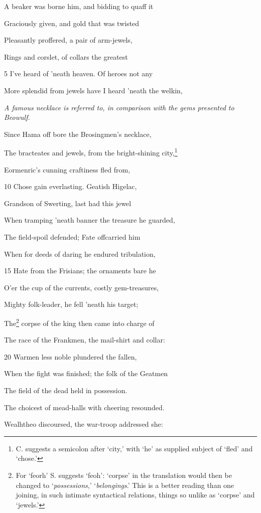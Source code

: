 A beaker was borne him, and bidding to quaff it

Graciously given, and gold that was twisted

Pleasantly proffered, a pair of arm-jewels,

Rings and corslet, of collars the greatest

5
I’ve heard of ’neath heaven. Of heroes not any

More splendid from jewels have I heard ’neath the welkin,

\emph{A famous necklace
is referred to, in
comparison with
the gems presented
to Beowulf.}

Since Hama off bore the Brosingmen’s necklace,

The bracteates and jewels, from the bright-shining city,\footnote{C. suggests a semicolon after ‘city,’ with ‘he’ as supplied subject of
‘fled’ and ‘chose.’}

Eormenric’s cunning craftiness fled from,

10
Chose gain everlasting. Geatish Higelac,

Grandson of Swerting, last had this jewel

When tramping ’neath banner the treasure he guarded,

The field-spoil defended; Fate offcarried him

When for deeds of daring he endured tribulation,

15
Hate from the Frisians; the ornaments bare he

O’er the cup of the currents, costly gem-treasures,

Mighty folk-leader, he fell ’neath his target;

The\footnote{For ‘feorh’ S. suggests ‘feoh’: ‘corpse’ in the translation would then
be changed to ‘\emph{possessions},’ ‘\emph{belongings}.’ This is a better reading than one
joining, in such intimate syntactical relations, things so unlike as ‘corpse’ and
‘jewels.’} corpse of the king then came into charge of

The race of the Frankmen, the mail-shirt and collar:

20
Warmen less noble plundered the fallen,

When the fight was finished; the folk of the Geatmen

The field of the dead held in possession.

The choicest of mead-halls with cheering resounded.

Wealhtheo discoursed, the war-troop addressed she:


